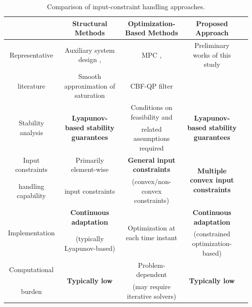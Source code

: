 \documentclass[letterpaper, journal, twoside]{IEEEtran}
\providecommand{\DIFadd}[1]{{\protect\color{blue}\uwave{#1}}} %
\providecommand{\DIFaddFL}[1]{\DIFadd{#1}} %
\providecommand{\DIFaddbeginFL}{} %
\providecommand{\DIFaddendFL}{} %
\begin{document}


\begin{table}[t]
  \renewcommand{\arraystretch}{1.3}
  \caption{
    Comparison of input-constraint handling approaches.
  }
  \centering
  \begin{tabular}{c c c c c }
  \hline
  & 
  \textbf{Structural Methods} 
  & 
  \textbf{Optimization-Based Methods} 
  & 
  \textbf{Proposed Approach}
  \\
  \hline
  \hline %
    Representative 
  & 
  Auxiliary system design \cite{Gao:2017aa,Ma:2025aa,Gao:2026aa,Yang:2021aa,Jia:2020aa,Liu:2024aa,Liu:2025aa,Esfandiari:2014aa,Esfandiari:2015aa,Yu:2022aa,Rezaei:2025aa,He:2016aa,He:2019aa,Zhao:2016aa,Peng:2020aa},
  &
  MPC \cite{Greune:2011aa,Bemporad:1999aa,Berberich:2025aa,Draeger:1995aa,Vahidi-Moghaddam:2025aa,Mallick:2025aa,Khodaverdian:2025aa},
  &
  Preliminary works of this study
  \\
  literature
  &
  Smooth approximation of saturation \cite{Wang:2013aa,Cui:2014aa,Li:2024aa}
  &
  CBF-QP filter \cite{Ames:2019aa,Ko:2025aa,Sweatland:2025aa}
  &
  \cite{Ryu:2025ab,Ryu:2025aa}
  \\
  \hline %
  \multirow{2}{*}{
    Stability analysis 
  }
  & 
  \multirow{2}{*}{
    \textbf{Lyapunov-based stability guarantees}
  }
  & 
  Conditions on feasibility and
  & 
  \multirow{2}{*}{
    \textbf{Lyapunov-based stability guarantees}
  }
  \\
  &
  &
  related assumptions required
  &
  \\
  \hline %
  Input constraints 
  & 
  Primarily element-wise 
  & 
  \textbf{General input constraints}
  &
  \multirow{2}{*}{
  \textbf{Multiple convex input constraints}
  }
  \\
  handling capability
  &
  \DIFaddbeginFL \DIFaddFL{(symmetric or asymmetric) }\DIFaddendFL input constraints
  &
  (convex/non-convex constraints)
  &
  \\
  \hline %
  \multirow{2}{*}{
    Implementation
  }
  &
    \textbf{Continuous adaptation}
  &
  \multirow{2}{*}{
    Optimization at each time instant
  }
  &
    \textbf{Continuous adaptation}
  \\
  &
  (typically Lyapunov-based)
  &
  &
  (constrained optimization-based)
  \\
  \hline
    Computational
  &
  \multirow{2}{*}{
    \textbf{Typically low}
  }
  &
  Problem-dependent
  &
  \multirow{2}{*}{
    \textbf{Typically low}
  }
  \\
  burden
  &
  &
  (may require iterative solvers)
  &
  \\
  \hline
  \end{tabular}
  \label{table:intro:comparison}
\end{table}
\end{document}

